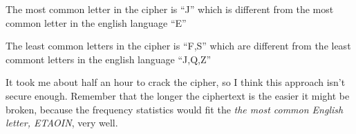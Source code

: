 \documentclass{article}
\begin{document}
The most common letter in the cipher is ``J'' which is different from the most
common letter in the english language ``E''

The least common letters in the cipher is ``F,S'' which are different from the
least commont letters in the english language ``J,Q,Z''

It took me about half an hour to crack the cipher, so I think this approach isn't
secure enough. Remember that the longer the ciphertext is the easier it might be
broken, because the frequency statistics would fit the \emph{the most common English
letter, ETAOIN}, very well. 
\end{document}
